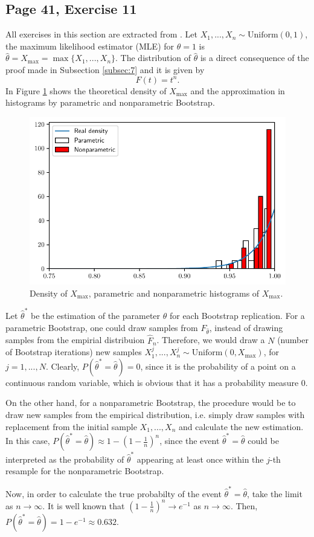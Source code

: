 \documentclass[11pt]{article}
\theoremstyle{definition}
\theoremstyle{remark}
\theoremstyle{remark}
\begin{document}
\subsection{Page 41, Exercise 11}
All exercises in this section are extracted from
\parencite{wasserman2006}.  Let
$X_1,...,X_n\sim \mathrm{Uniform}(0,1)$, the maximum likelihood
estimator (MLE) for $\theta=1$ is
$\hat{\theta}=X_{\max}=\max\{X_1,...,X_n\}$. The distribution of
$\hat{\theta}$ is a direct consequence of the proof made in Subsection
\ref{subsec:7} and it is given by
\[
  F(t)=t^n.
\]
In Figure \ref{fig:max_density} shows the theoretical density of
$X_{\max}$ and the approximation in histograms by parametric and
nonparametric Bootstrap.
\begin{figure}[H]
  \centering
  \includegraphics[scale=.7]{../figs/max_density.pdf}
  \caption{Density of $X_{\max}$, parametric and nonparametric
    histograms of $X_{\max}$.}
  \label{fig:max_density}
\end{figure}

Let $\hat{\theta}^*$ be the estimation of the parameter $\theta$ for
each Bootstrap replication. For a parametric Bootstrap, one could draw
samples from $F_{\hat{\theta}}$, instead of drawing samples from the
empirial distribuion $\hat{F}_n$. Therefore, we would draw a $N$
(number of Bootstrap iterations) new samples
$X_1^j,...,X_n^j\sim\mathrm{Uniform}(0,X_{\max})$, for
$j=1,...,N$. Clearly, $P(\hat{\theta}^*=\hat{\theta})=0$, since it is
the probability of a point on a continuous random variable, which is
obvious that it has a probability measure 0.

On the other hand, for a nonparametric Bootstrap, the procedure would
be to draw new samples from the empirical distribution, i.e. simply
draw samples with replacement from the initial sample $X_1,...,X_n$
and calculate the new estimation. In this case,
$P(\hat{\theta}^*=\hat{\theta})\approx1-(1-\frac{1}{n})^n$, since the
event $\hat{\theta}^*=\hat{\theta}$ could be interpreted as the
probability of $\hat{\theta}^*$ appearing at least once within the
$j$-th resample for the nonparametric Bootstrap.

Now, in order to calculate the true probabilty of the event
$\hat{\theta}^*=\hat{\theta}$, take the limit as
$n\rightarrow\infty$. It is well known that
$(1-\frac{1}{n})^n\rightarrow e^{-1}$ as $n\rightarrow\infty$. Then,
$P(\hat{\theta}^*=\hat{\theta})=1-e^{-1}\approx0.632$.

\printbibliography
\end{document}
